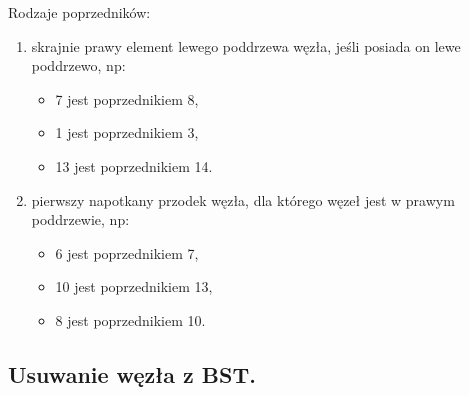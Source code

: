 \documentclass[main.tex]{subfiles}
\begin{document}
    Rodzaje poprzedników:
    \begin{enumerate}
        \item skrajnie prawy element lewego poddrzewa węzła, jeśli posiada on lewe poddrzewo, np:
        \begin{itemize}
            \item 7 jest poprzednikiem 8,
            \item 1 jest poprzednikiem 3,
            \item 13 jest poprzednikiem 14.
        \end{itemize}
        \item pierwszy napotkany przodek węzła, dla którego węzeł jest w prawym poddrzewie, np:
        \begin{itemize}
            \item 6 jest poprzednikiem 7,
            \item 10 jest poprzednikiem 13,
            \item 8 jest poprzednikiem 10.
        \end{itemize}
    \end{enumerate}

    \subsection{Usuwanie węzła z BST.}
\end{document}
